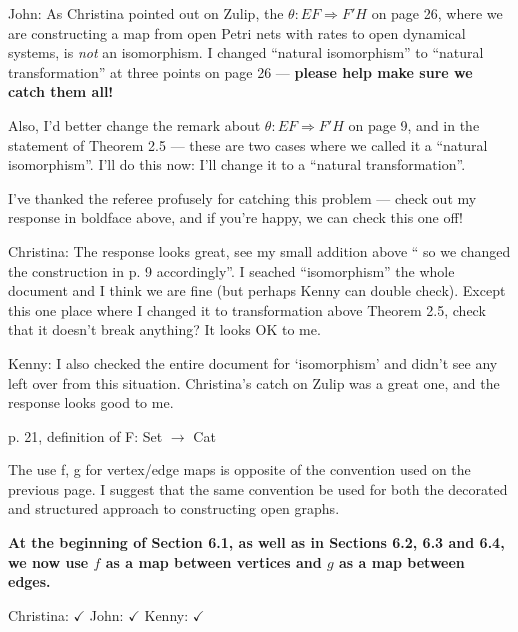 \documentclass[reqno]{amsart}
\def\chris{\color{purple} Christina: }
\def\john{\color{red} John: }
\def\kenny{\color{blue} Kenny: }
\begin{document}
\begin{enumerate}
{{\john  As Christina pointed out on Zulip, the $\theta : EF \Rightarrow F'H$ on page 26, where we are
constructing a map from open Petri nets with rates to open dynamical systems, is \emph{not} an
isomorphism.  I changed ``natural isomorphism'' to ``natural transformation'' at three points on page 26 --- 
{\bf please help make sure we catch them all!}

Also, I'd better change the remark about  $\theta: EF \Rightarrow F'H$  on page 9, and
 in the statement of Theorem 2.5 --- these are two cases where we called it a ``natural 
isomorphism''.    I'll do this now: I'll change it to a ``natural transformation''.

I've thanked the referee profusely for catching this problem --- check out my response in boldface
above, and if you're happy, we can check this one off!}

{\chris The response looks great, see my small addition above `` so we changed the construction in p. 
9 accordingly''. I seached ``isomorphism'' the whole document and I think we are fine (but perhaps 
Kenny can double check). Except this one place where I changed it to transformation above Theorem 2.5, check that it doesn't break anything? It looks 
OK to me.}

{\kenny I also checked the entire document for `isomorphism' and didn't see any left over from this situation. Christina's catch on Zulip was a great one, and the response looks good to me.}
\fi

\item p. 21, definition of F: Set $\to$ Cat

The use f, g for vertex/edge maps is opposite of the convention used on the previous page. I suggest that the same convention be used for both the 
decorated and structured approach to constructing open graphs.

{\bf At the beginning of Section 6.1, as well as in Sections 6.2, 6.3 and 6.4, we now use $f$ as a map between vertices and $g$ as a map 
between edges.} 

{\chris $\checkmark$} {\john $\checkmark$} {\kenny  $\checkmark$}




}
\end{enumerate}
\end{document}
